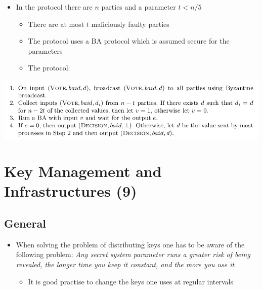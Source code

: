 \documentclass[11pt]{article}
\begin{document}
\begin{itemize}
\item In the protocol there are \(n\) parties and a parameter \(t < n/5\)
\begin{itemize}
\item There are at most \(t\) maliciously faulty parties
\item The protocol uses a BA protocol which is assumed secure for the parameters
\item The protocol:
\end{itemize}
\end{itemize}
\begin{center}
\includegraphics[width=.9\linewidth]{Asynchronous Agreement (8)/screenshot_2018-09-30_08-52-14.png}
\end{center}

\section{Key Management and Infrastructures (9)}
\label{sec:orga3ede1f}
\subsection{General}
\label{sec:org7cd52ad}
\begin{itemize}
\item When solving the problem of distributing keys one has to be aware of the following problem: \emph{Any secret system parameter runs a greater risk of being revealed, the longer time you keep it constant, and the more you use it}
\begin{itemize}
\item It is good practise to change the keys one uses at regular intervals
\end{itemize}
\end{itemize}
\end{document}
